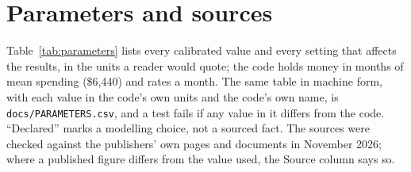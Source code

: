\section{Parameters and sources}\label{app:parameters}

Table~\ref{tab:parameters} lists every calibrated value and every setting that affects the results, in the units a
reader would quote; the code holds money in months of mean spending (\$6,440) and rates a month. The same table in
machine form, with each value in the code's own units and the code's own name, is \texttt{docs/PARAMETERS.csv}, and a
test fails if any value in it differs from the code. ``Declared'' marks a modelling choice, not a sourced fact. The
sources were checked against the publishers' own pages and documents in November 2026; where a published figure
differs from the value used, the Source column says so.

